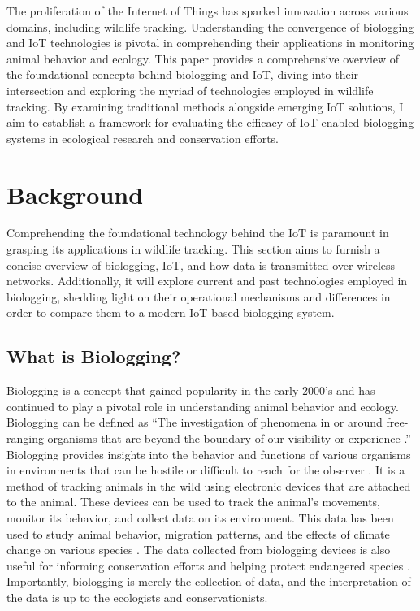 \documentclass[sigplan,screen,nonacm]{acmart}
\begin{document}
The proliferation of the Internet of Things has sparked innovation across various domains, including 
wildlife tracking. Understanding the convergence of biologging and IoT technologies is pivotal in comprehending 
their applications in monitoring animal behavior and ecology. This paper provides a comprehensive overview of 
the foundational concepts behind biologging and IoT, diving into their intersection and exploring the myriad of 
technologies employed in wildlife tracking. By examining traditional methods alongside emerging IoT solutions, 
I aim to establish a framework for evaluating the efficacy of IoT-enabled biologging systems in ecological 
research and conservation efforts.

\section{Background}
\label{sec:Background}

Comprehending the foundational technology behind the IoT
is paramount in grasping its applications in wildlife tracking. This section
aims to furnish a concise overview of biologging, IoT, and how data is transmitted 
over wireless networks. Additionally, it will explore current and past
technologies employed in biologging, shedding light on their operational
mechanisms and differences in order to compare them to a modern IoT based biologging 
system.

\subsection{What is Biologging?}
\label{subsec:What is Biologging}

Biologging is a concept that gained popularity in the early 2000's and has continued
to play a pivotal role in understanding animal behavior and ecology. Biologging can be
defined as ``The investigation of phenomena in or around free-ranging organisms that are beyond
the boundary of our visibility or experience \cite{boyd2004bio}.'' Biologging provides
insights into the behavior and functions of various organisms in environments that
can be hostile or difficult to reach for the observer \cite{boyd2004bio}.
It is a method of tracking animals in the wild using electronic devices that are
attached to the animal. These devices can be used to track the animal's
movements, monitor its behavior, and collect data on its environment. This data
has been used to study animal behavior, migration patterns, and the effects of climate change
on various species \cite{10.3389/fevo.2018.00092}. The data collected from biologging
devices is also useful for informing conservation efforts and helping protect endangered
species \cite{cooke2008biotelemetry}. Importantly, biologging is merely the collection of data, 
and the interpretation of the data is up to the ecologists and conservationists.
\end{document}
